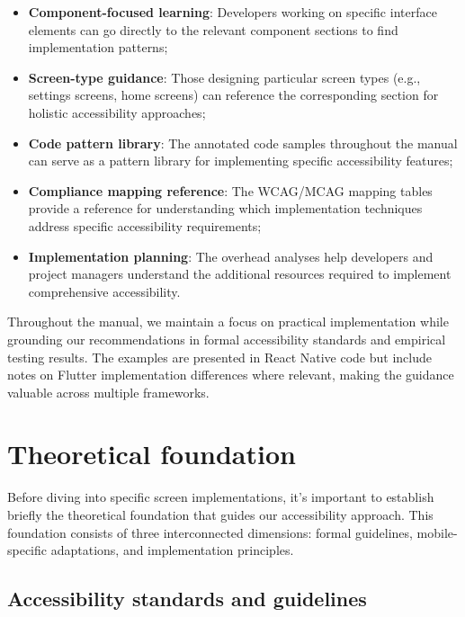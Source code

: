 \begin{itemize}
    \item \textbf{Component-focused learning}: Developers working on specific interface elements can go directly to the relevant component sections to find implementation patterns;
    
    \item \textbf{Screen-type guidance}: Those designing particular screen types (e.g., settings screens, home screens) can reference the corresponding section for holistic accessibility approaches;
    
    \item \textbf{Code pattern library}: The annotated code samples throughout the manual can serve as a pattern library for implementing specific accessibility features;
    
    \item \textbf{Compliance mapping reference}: The WCAG/MCAG mapping tables provide a reference for understanding which implementation techniques address specific accessibility requirements;
    
    \item \textbf{Implementation planning}: The overhead analyses help developers and project managers understand the additional resources required to implement comprehensive accessibility.
\end{itemize}

Throughout the manual, we maintain a focus on practical implementation while grounding our recommendations in formal accessibility standards and empirical testing results. The examples are presented in React Native code but include notes on Flutter implementation differences where relevant, making the guidance valuable across multiple frameworks.

\section{Theoretical foundation}
\label{sec:dev-theoretical-foundation}

Before diving into specific screen implementations, it's important to establish briefly the theoretical foundation that guides our accessibility approach. This foundation consists of three interconnected dimensions: formal guidelines, mobile-specific adaptations, and implementation principles.

\subsection{Accessibility standards and guidelines}
\label{subsec:dev-standards}

